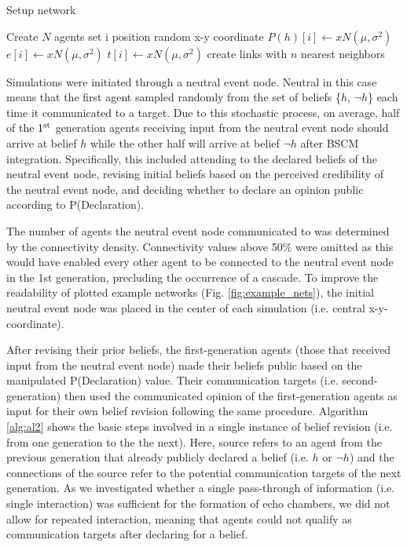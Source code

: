 \documentclass[fleqn,10pt]{wlscirep}
\begin{document}
\begin{algorithm}[H]
\caption{Setup network}\label{setup}
\begin{algorithmic}[1]
   \label{alg:al1}
    \State Create $N$ agents
        \State set i position random x-y coordinate
     \EndFor
  \EndProcedure
      \State $P(h)[i]\gets x$\thicksim$N(\mu, \sigma^2)$ 
      \State $e[i]\gets x$\thicksim$N(\mu, \sigma^2)$
      \State $t[i]\gets x$\thicksim$N(\mu, \sigma^2)$
      \State create links with $n$ nearest neighbors 
     \EndFor
  \EndProcedure
\end{algorithmic}
\end{algorithm}

Simulations were initiated through a neutral event node. Neutral in this case means that the first agent sampled randomly from the set of beliefs \{\(h\), \(\neg h\)\} each time it communicated to a target. Due to this stochastic process, on average, half of the \(1\textsuperscript{st}\) generation agents receiving input from the neutral event node should arrive at belief \(h\) while the other half will arrive at belief \(\neg h\) after BSCM integration. Specifically, this included attending to the declared beliefs of the neutral event node, revising initial beliefs based on the perceived credibility of the neutral event node, and deciding whether to declare an opinion public according to P(Declaration).

The number of agents the neutral event node communicated to was determined by the connectivity density. Connectivity values above 50\% were omitted as this would have enabled every other agent to be connected to the neutral event node in the 1st generation, precluding the occurrence of a cascade. To improve the readability of plotted example networks (Fig. \ref{fig:example_nets}), the initial neutral event node was  placed in the center of each simulation (i.e. central x-y-coordinate).

After revising their prior beliefs, the first-generation agents (those that received input from the neutral event node) made their beliefs public based on the manipulated P(Declaration) value. Their communication targets (i.e. second-generation) then used the communicated opinion of the first-generation agents as input for their own belief revision following the same procedure. Algorithm \ref{alg:al2} shows the basic steps involved in a single instance of belief revision (i.e. from one generation to the the next). Here, source refers to an agent from the previous generation that already publicly declared a belief (i.e. \(h\) or \(\neg h\)) and the connections of the source refer to the potential communication targets of the next generation. As we investigated whether a single pass-through of information (i.e. single interaction) was sufficient for the formation of echo chambers, we did not allow for repeated interaction, meaning that agents could not qualify as communication targets after declaring for a belief. 
\end{document}
